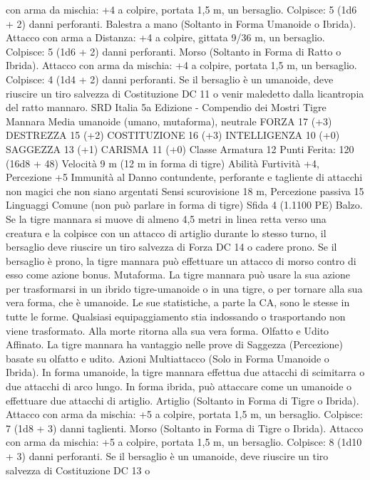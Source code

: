 \begin{multicols}{2}
con arma da mischia: +4 a colpire, portata 1,5 m, un bersaglio.
Colpisce: 5 (1d6 + 2) danni perforanti.
Balestra a mano (Soltanto in Forma Umanoide o Ibrida).
Attacco con arma a Distanza: +4 a colpire, gittata 9/36 m, un
bersaglio.
Colpisce: 5 (1d6 + 2) danni perforanti.
Morso (Soltanto in Forma di Ratto o Ibrida). Attacco con arma
da mischia: +4 a colpire, portata 1,5 m, un bersaglio.
Colpisce: 4 (1d4 + 2) danni perforanti. Se il bersaglio è un
umanoide, deve riuscire un tiro salvezza di Costituzione DC 11 o
venir maledetto dalla licantropia del ratto mannaro.
SRD Italia 5a Edizione - Compendio dei Mostri
Tigre Mannara
Media umanoide (umano, mutaforma), neutrale
FORZA 17 (+3)
DESTREZZA 15 (+2)
COSTITUZIONE 16 (+3)
INTELLIGENZA 10 (+0)
SAGGEZZA 13 (+1)
CARISMA 11 (+0)
Classe Armatura 12
\hspace*{0pt}\hfill{Punti Ferita}: 120 (16d8 + 48)
Velocità 9 m (12 m in forma di tigre)
Abilità Furtività +4, Percezione +5
Immunità al Danno contundente, perforante e tagliente di
attacchi non magici che non siano argentati
Sensi scurovisione 18 m, Percezione passiva 15
Linguaggi Comune (non può parlare in forma di tigre)
Sfida 4 (1.1100 PE)
Balzo. Se la tigre mannara si muove di almeno 4,5 metri in linea
retta verso una creatura e la colpisce con un attacco di artiglio
durante lo stesso turno, il bersaglio deve riuscire un tiro salvezza
di Forza DC 14 o cadere prono. Se il bersaglio è prono, la tigre
mannara può effettuare un attacco di morso contro di esso come
azione bonus.
Mutaforma. La tigre mannara può usare la sua azione per
trasformarsi in un ibrido tigre-umanoide o in una tigre, o per
tornare alla sua vera forma, che è umanoide. Le sue statistiche, a
parte la CA, sono le stesse in tutte le forme. Qualsiasi
equipaggiamento stia indossando o trasportando non viene
trasformato. Alla morte ritorna alla sua vera forma.
Olfatto e Udito Affinato. La tigre mannara ha vantaggio nelle
prove di Saggezza (Percezione) basate su olfatto e udito.
Azioni
Multiattacco (Solo in Forma Umanoide o Ibrida). In forma
umanoide, la tigre mannara effettua due attacchi di scimitarra o
due attacchi di arco lungo. In forma ibrida, può attaccare come
un umanoide o effettuare due attacchi di artiglio.
Artiglio (Soltanto in Forma di Tigre o Ibrida). Attacco con
arma da mischia: +5 a colpire, portata 1,5 m, un bersaglio.
Colpisce: 7 (1d8 + 3) danni taglienti.
Morso (Soltanto in Forma di Tigre o Ibrida). Attacco con arma
da mischia: +5 a colpire, portata 1,5 m, un bersaglio.
Colpisce: 8 (1d10 + 3) danni perforanti. Se il bersaglio è un
umanoide, deve riuscire un tiro salvezza di Costituzione DC 13 o

\end{multicols}
